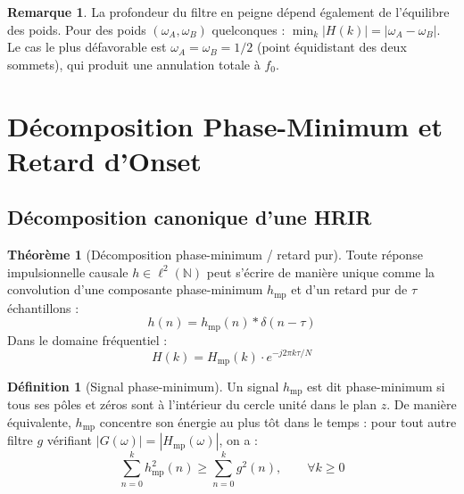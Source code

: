 \documentclass[12pt, a4paper]{article}
\theoremstyle{definition}
\newtheorem{definition}{Définition}[section]
\newtheorem{theoreme}{Théorème}[section]
\newtheorem{remarque}{Remarque}[section]
\newcommand{\N}{\mathbb{N}}
\newcommand{\abs}[1]{\left| #1 \right|}
\begin{document}
\begin{remarque}
  La profondeur du filtre en peigne dépend également de l'équilibre des
  poids. Pour des poids $(\omega_A, \omega_B)$ quelconques :
  $\min_k\abs{H(k)} = \abs{\omega_A - \omega_B}$. Le cas le plus défavorable
  est $\omega_A = \omega_B = 1/2$ (point équidistant des deux sommets),
  qui produit une annulation totale à $f_0$.
\end{remarque}

\section{Décomposition Phase-Minimum et Retard d'Onset}

\subsection{Décomposition canonique d'une HRIR}

\begin{theoreme}[Décomposition phase-minimum / retard pur]
  Toute réponse impulsionnelle causale $h \in \ell^2(\N)$ peut s'écrire de
  manière unique comme la convolution d'une composante phase-minimum
  $h_{\mathrm{mp}}$ et d'un retard pur de $\tau$ échantillons :
  \begin{equation}
    h(n) = h_{\mathrm{mp}}(n) * \delta(n - \tau)
    \label{eq:decomposition}
  \end{equation}
  Dans le domaine fréquentiel :
  \begin{equation}
    H(k) = H_{\mathrm{mp}}(k) \cdot e^{-j2\pi k\tau/N}
    \label{eq:decomposition_freq}
  \end{equation}
\end{theoreme}

\begin{definition}[Signal phase-minimum]
  Un signal $h_{\mathrm{mp}}$ est dit phase-minimum si tous ses pôles et
  zéros sont à l'intérieur du cercle unité dans le plan $z$. De manière
  équivalente, $h_{\mathrm{mp}}$ concentre son énergie au plus tôt dans le
  temps : pour tout autre filtre $g$ vérifiant $\abs{G(\omega)} = \abs{H_{\mathrm{mp}}(\omega)}$,
  on a :
  \begin{equation}
    \sum_{n=0}^{k} h_{\mathrm{mp}}^2(n) \geq \sum_{n=0}^{k} g^2(n), \qquad \forall k \geq 0
  \end{equation}
\end{definition}
\end{document}
